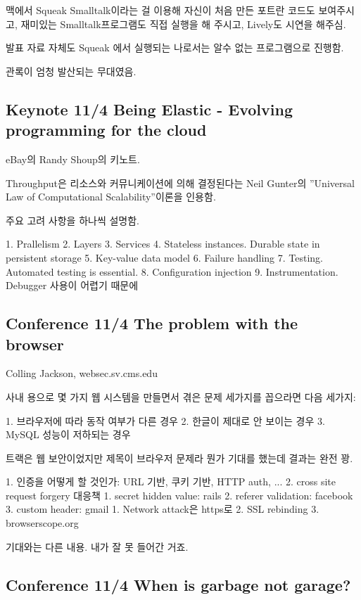\documentclass[a4paper]{article}
\begin{document}
맥에서 Squeak Smalltalk이라는 걸 이용해 자신이 처음 만든 포트란 코드도
보여주시고, 재미있는 Smalltalk프로그램도 직접 실행을 해 주시고,
Lively도 시연을 해주심.
 
발표 자료 자체도 Squeak 에서 실행되는 나로서는 알수 없는 프로그램으로
진행함.
 
관록이 엄청 발산되는 무대였음. 
 
\subsection{Keynote 11/4 Being Elastic - Evolving programming for the cloud}
 
eBay의 Randy Shoup의 키노트.
 
Throughput은 리소스와 커뮤니케이션에 의해 결정된다는 Neil Gunter의
”Universal Law of Computational Scalability”이론을 인용함.
 
주요 고려 사항을 하나씩 설명함.
 
1. Prallelism
2. Layers
3. Services
4. Stateless instances. Durable state in persistent storage
5. Key-value data model
6. Failure handling
7. Testing. Automated testing is essential.
8. Configuration injection
9. Instrumentation. Debugger 사용이 어렵기 때문에
 
\subsection{Conference 11/4 The problem with the browser}
 
Colling Jackson, websec.sv.cms.edu
 
사내 용으로 몇 가지 웹 시스템을 만들면서 겪은 문제 세가지를 꼽으라면 다음 세가지:
 
1. 브라우저에 따라 동작 여부가 다른 경우
2. 한글이 제대로 안 보이는 경우
3. MySQL 성능이 저하되는 경우
 
트랙은 웹 보안이었지만 제목이 브라우저 문제라 뭔가 기대를 했는데 결과는 완전 꽝.
 
1. 인증을 어떻게 할 것인가: URL 기반, 쿠키 기반, HTTP auth, ...
2. cross site request forgery 대응책
1. secret hidden value: rails
2. referer validation: facebook
3. custom header: gmail
1. Network  attack은 https로 
2. SSL rebinding
3. browserscope.org 
 
기대와는 다른 내용. 내가 잘 못 들어간 거죠.
 
\subsection{Conference 11/4 When is garbage not garage?}
 
\end{document}
